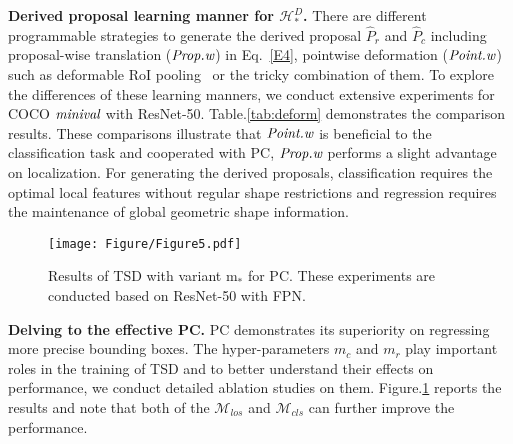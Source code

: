 \documentclass[10pt,twocolumn,letterpaper]{article}
\def \algname{TSD}
\def \loss{PC}
\begin{document}
\textbf{Derived proposal learning manner for $\mathcal{H}^D_*$.}
There are different programmable strategies to generate the derived proposal $\hat{P}_r$ and $\hat{P}_c$ including proposal-wise translation ($\emph{Prop.w}$) in Eq.~\ref{E4}, pointwise deformation ($\emph{Point.w}$) such as deformable RoI pooling~\cite{dai2017deformable} or the tricky combination of them.
To explore the differences of these learning manners, we conduct extensive experiments for 
COCO $\emph{minival}$ with ResNet-50.
Table.\ref{tab:deform} demonstrates the comparison results.
These comparisons illustrate that $\emph{Point.w}$ is beneficial to the classification task and cooperated with \loss{}, $\emph{Prop.w}$ performs a slight advantage on localization.
For generating the derived proposals, classification requires the optimal local features without regular shape restrictions and regression requires the maintenance of global geometric shape information.



\begin{figure}[h]
  \centering 
  \texttt{[image: Figure/Figure5.pdf]}
  \caption{Results of \algname{} with variant m$_*$ for \loss{}. These experiments are conducted based on ResNet-50 with FPN.} 
  \label{fig:loss}
\end{figure}

\textbf{Delving to the effective \loss{}.}
\loss{} demonstrates its superiority on regressing more precise bounding boxes.
The hyper-parameters $m_c$ and $m_r$ play important roles in the training of \algname{} and to better understand their effects on performance, we conduct detailed ablation studies on them.
Figure.\ref{fig:loss} reports the results and note that both of the $\mathcal{M}_{los}$ and $\mathcal{M}_{cls}$ can further improve the performance.
\end{document}

